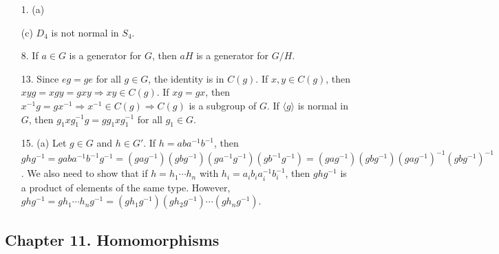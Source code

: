 {\small
\begin{itemize}
 
\item[1.]
(a)

(c) $D_4$ is not normal in $S_4$.
 
 


 
\item[8.]
If $a \in G$ is a generator for $G$, then $aH$ is a generator for $G/H$.
 
\item[13.]
Since $eg = ge$ for all $g \in G$, the identity is in $C(g)$. If $x,
y \in C(g)$, then $xy g = x g y = g xy \Rightarrow xy \in C(g)$.  If
$x g = g x$, then $x^{-1} g = g x^{-1} \Rightarrow x^{-1} \in C(g)
\Rightarrow C(g)$ is a subgroup of $G$. If $\langle g \rangle$ is
normal in $G$, then $g_1 x g_1^{-1} g = g g_1 x g_1^{-1}$ for all $g_1
\in G$.
 
\item[15.]
(a)
Let $g \in G$ and $h \in G'$. If $h = aba^{-1}b^{-1}$, then $ghg^{-1}
= gaba^{-1}b^{-1}g^{-1} 
= (gag^{-1})(gbg^{-1})(ga^{-1}g^{-1})(gb^{-1}g^{-1}) 
= (gag^{-1})(gbg^{-1})(gag^{-1})^{-1}(gbg^{-1})^{-1}$. We also need to
show that if $h = h_1 \cdots h_n$ with $h_i = a_i b_i a_i^{-1}
b_i^{-1}$, then $ghg^{-1}$ is a product of elements of the same type.
However, $ghg^{-1} = g h_1 \cdots h_n g^{-1} =
(gh_1g^{-1})(gh_2g^{-1}) \cdots (gh_ng^{-1})$.
 
 
 
 
\end{itemize}
}

\subsection*{Chapter 11. Homomorphisms}
 
